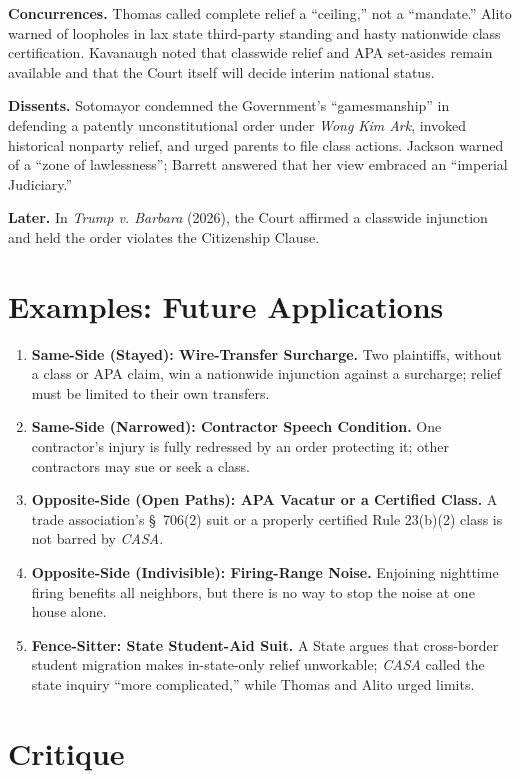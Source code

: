 \documentclass[12pt]{article}
\begin{document}
\textbf{Concurrences.} Thomas called complete relief a ``ceiling,'' not a ``mandate.'' Alito warned of loopholes in lax state third-party standing and hasty nationwide class certification. Kavanaugh noted that classwide relief and APA set-asides remain available and that the Court itself will decide interim national status.

\textbf{Dissents.} Sotomayor condemned the Government's ``gamesmanship'' in defending a patently unconstitutional order under \textit{Wong Kim Ark}, invoked historical nonparty relief, and urged parents to file class actions. Jackson warned of a ``zone of lawlessness''; Barrett answered that her view embraced an ``imperial Judiciary.''

\textbf{Later.} In \textit{Trump v. Barbara} (2026), the Court affirmed a classwide injunction and held the order violates the Citizenship Clause.

\section{Examples: Future Applications}

\begin{enumerate}
\item \textbf{Same-Side (Stayed): Wire-Transfer Surcharge.} Two plaintiffs, without a class or APA claim, win a nationwide injunction against a surcharge; relief must be limited to their own transfers.
\item \textbf{Same-Side (Narrowed): Contractor Speech Condition.} One contractor's injury is fully redressed by an order protecting it; other contractors may sue or seek a class.
\item \textbf{Opposite-Side (Open Paths): APA Vacatur or a Certified Class.} A trade association's \S~706(2) suit or a properly certified Rule 23(b)(2) class is not barred by \textit{CASA}.
\item \textbf{Opposite-Side (Indivisible): Firing-Range Noise.} Enjoining nighttime firing benefits all neighbors, but there is no way to stop the noise at one house alone.
\item \textbf{Fence-Sitter: State Student-Aid Suit.} A State argues that cross-border student migration makes in-state-only relief unworkable; \textit{CASA} called the state inquiry ``more complicated,'' while Thomas and Alito urged limits.
\end{enumerate}

\section{Critique}
\end{document}
